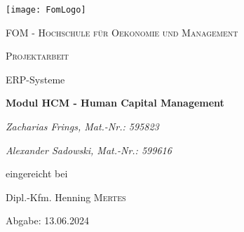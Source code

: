 \begin{titlepage}

	\centering
	\texttt{[image: FomLogo]}\par\vspace{1cm}
	{\scshape\LARGE FOM - Hochschule für Oekonomie und Management \par}
	\vspace{1cm}
	{\scshape\Large Projektarbeit\par ERP-Systeme\par}
	\vspace{1.5cm}
	{\huge\bfseries Modul HCM - Human Capital Management\par}
	\vspace{2cm}
	{\Large\itshape Zacharias Frings, Mat.-Nr.: 595823\par}
	{\Large\itshape Alexander Sadowski, Mat.-Nr.: 599616\par}
	\vfill
	eingereicht bei\par
	Dipl.-Kfm. Henning \textsc{Mertes}

	\vfill

	{\large Abgabe: 13.06.2024\par}
\end{titlepage}